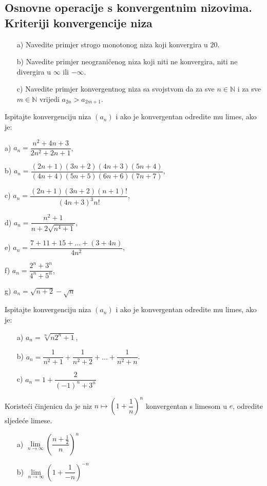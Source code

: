 \subsection*{Osnovne operacije s konvergentnim nizovima. Kriteriji konvergencije niza}
\begin{exercise} \textbf{}
\begin{itemize}
\item[a)] Navedite primjer strogo monotonog niza koji konvergira u $20$.
\item[b)] Navedite primjer neograničenog niza koji niti ne konvergira, niti ne divergira u $\infty$ ili $-\infty$.
\item[c)] Navedite primjer konvergentnog niza sa svojstvom da za sve $n\in \mathbb{N}$ i za sve $m\in \mathbb{N}$ vrijedi $a_{2n}>a_{2m+1}$.
\end{itemize}
\end{exercise}
\begin{exercise}
Ispitajte konvergenciju niza $(a_n)$ i ako je konvergentan odredite mu limes, ako je: 
\begin{AutoMultiColItemize}
\item[a)] $a_n=\dfrac{n^2+4n+3}{2n^2+2n+1}$,
\item[b)] $a_n=\dfrac{(2n+1)(3n+2)(4n+3)(5n+4)}{(4n+4)(5n+5)(6n+6)(7n+7)}$,
\item[c)] $a_n=\dfrac{(2n+1)(3n+2)(n+1)!}{(4n+3)^3n!}$,
\item[d)] $a_n=\dfrac{n^2+1}{n+2\sqrt{n^4+1}}$,
\item[e)] $a_n=\dfrac{7+11+15+\dots+(3+4n)}{4n^2}$,
\item[f)] $a_n=\dfrac{2^n+3^n}{4^n+5^n}$,
\item[g)] $a_n=\sqrt{n+2}-\sqrt{n}$
\end{AutoMultiColItemize}
\end{exercise}
\begin{exercise} Ispitajte konvergenciju niza $(a_n)$ i ako je konvergentan odredite mu limes, ako je:
\begin{itemize}
\item[a)] $a_n=\sqrt[n]{n2^n+1}$,
\item[b)] $a_n=\dfrac{1}{n^2+1}+\dfrac{1}{n^2+2}+\dots+\dfrac{1}{n^2+n}$.
\item[c)] $a_n=1+\dfrac{2}{(-1)^n+3^n}$
\end{itemize}
\end{exercise}
\begin{exercise}
Koristeći činjenicu da je niz $n\mapsto \left(1+\dfrac{1}{n}\right)^n$ konvergentan s limesom u $e$, odredite sljedeće limese.
\begin{itemize}
\item[a)] $\lim\limits_{n\to \infty}\left(\dfrac{n+\frac{1}{2}}{n}\right)^n$
\item[b)] $\lim\limits_{n\to \infty}\left(1+\dfrac{1}{-n}\right)^{-n}$
\end{itemize}
\end{exercise}
